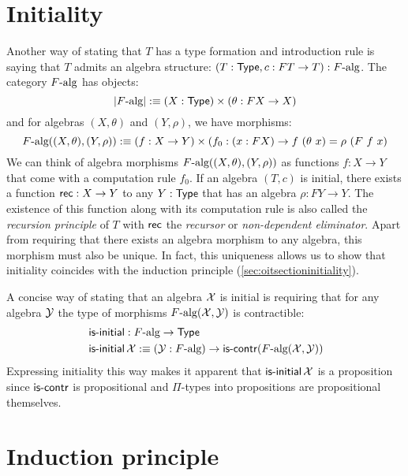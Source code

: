 \documentclass[a4paper,10pt]{report}
\begin{document}
\section{Initiality}
\label{sec:oitinitiality}

Another way of stating that $T$ has a type formation and introduction
rule is saying that $T$ admits an algebra structure:
$(T : \mathsf{Type} , c : FT \to T) : F\mbox{-alg}$. The category $F\mbox{-alg}$
has objects:
$$
| F\mbox{-alg} | :\equiv (X : \mathsf{Type}) \times (\theta : FX \to X)
$$
and for algebras $(X,\theta)$ and $(Y,\rho)$, we have morphisms:
$$
\algcat{F}((X,\theta),(Y,\rho)) \ddefeq (f : X \to Y) \times (f_0 : (x : FX) \to f\ (\theta\ x) = \rho\ (F\ f\ x)
$$
We can think of algebra morphisms $F\mbox{-alg}((X,\theta),(Y,\rho))$ as
functions $f : X \to Y$ that come with a computation rule $f_0$. If an
algebra $(T,c)$ is initial, there exists a function $\mathsf{rec} : X \to Y$
to any $Y : \mathsf{Type}$ that has an algebra $\rho : FY \to Y$. The
existence of this function along with its computation rule is also
called the \emph{recursion principle} of $T$ with $\mathsf{rec}$ the
\emph{recursor} or \emph{non-dependent eliminator}. Apart from
requiring that there exists an algebra morphism to any algebra, this
morphism must also be unique. In fact, this uniqueness allows us to
show that initiality coincides with the induction principle
(\cref{sec:oitsectioninitiality}).

A concise way of stating that an algebra $\mathcal{X}$ is initial is
requiring that for any algebra $\mathcal{Y}$ the type of morphisms
$F\mbox{-alg}(\mathcal{X},\mathcal{Y})$ is contractible:
%
\begin{align*}
&\operatorname{\mathsf{is-initial}} : F\mbox{-alg} \to \mathsf{Type} \\
&\operatorname{\mathsf{is-initial}} \mathcal{X} :\equiv (\mathcal{Y} : F\mbox{-alg}) \to \operatorname{\mathsf{is-contr}} (F\mbox{-alg}(\mathcal{X},\mathcal{Y}))
\end{align*}
%
Expressing initiality this way makes it apparent that
$\operatorname{\mathsf{is-initial}} \mathcal{X}$ is a proposition since $\operatorname{\mathsf{is-contr}}$ is
propositional and $\Pi$-types into propositions are propositional
themselves.

\section{Induction principle}
\label{sec:oitinduction}
\end{document}
